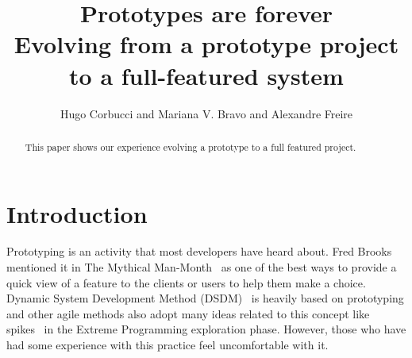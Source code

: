 \documentclass[lnbip]{svmultln}
\newcommand{\ale}[1]{}%
\begin{document}
%
\mainmatter %
%
\title{Prototypes are forever\\
  Evolving from a prototype project\\ to a full-featured system}
%
%
\author{Hugo Corbucci and Mariana V. Bravo  and
  Alexandre Freire}
%
%
%

\maketitle %

\begin{abstract} %

  This paper shows our experience evolving a prototype to a full
  featured project.
\end{abstract}
%
\section{Introduction}

Prototyping is an activity that most developers have heard about. Fred
Brooks mentioned it in The Mythical Man-Month~\cite{Brooks1975} as one
of the best ways to provide a quick view of a feature to the clients
or users to help them make a choice. Dynamic System Development Method
(DSDM)~\cite{DSDM} is heavily based on prototyping and other agile
methods also adopt many ideas related to this concept like
spikes~\cite{XP} in the Extreme Programming exploration
phase. However, those who have had some experience with this practice
feel uncomfortable with it\ale{quem disse? esse tipo de afirmação é
  sempre bom ter uma citação, já apanhei bastante sobre isso.}.
\end{document}
